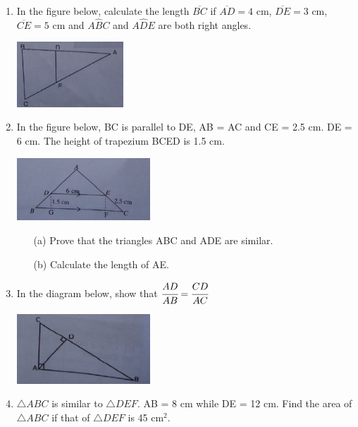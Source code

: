 \begin{enumerate}
		\item In the figure below, calculate the length $\overline{BC}$ if $\overline{AD} = 4$ cm, $\overline{DE} = 3$ cm, $\overline{CE} = 5$ cm and $A\hat{B}C$ and $A\hat{D}E$ are both right angles.
	
	\begin{center}
	\includegraphics[width=4cm]{./img/sim10.jpg}
	\end{center}

	\item In the figure below, BC is parallel to DE, AB = AC and CE = 2.5 cm. DE = 6 cm. The height of trapezium BCED is 1.5 cm.
	
	\begin{center}
	\includegraphics[width=5cm]{./img/sim4.jpg}
	\end{center}

	\begin{itemize}
	\item[(a)] Prove that the triangles ABC and ADE are similar.
	\item[(b)] Calculate the length of AE.
	\end{itemize}
	
	\item In the diagram below, show that $\cfrac{AD}{AB} = \cfrac{CD}{AC}$
	
	\begin{center}
	\includegraphics[width=5cm]{./img/sim7.jpg}
	\end{center}

	\item $\bigtriangleup ABC$ is similar to $\bigtriangleup DEF$. AB = 8 cm while DE = 12 cm. Find the area of $\bigtriangleup ABC$ if that of $\bigtriangleup DEF$ is 45 cm$^2$.
	

\end{enumerate}
